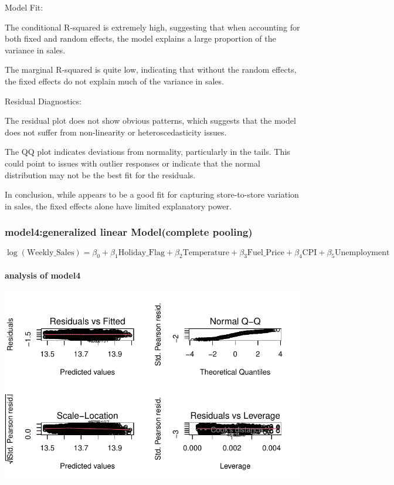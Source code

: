 \documentclass[
  letterpaper,
  DIV=11,
  numbers=noendperiod]{scrartcl}
\let\oldparagraph\paragraph
\renewcommand{\paragraph}[1]{\oldparagraph{#1}\mbox{}}
\begin{document}
Model Fit:

The conditional R-squared is extremely high, suggesting that when
accounting for both fixed and random effects, the model explains a large
proportion of the variance in sales.

The marginal R-squared is quite low, indicating that without the random
effects, the fixed effects do not explain much of the variance in sales.

Residual Diagnostics:

The residual plot does not show obvious patterns, which suggests that
the model does not suffer from non-linearity or heteroscedasticity
issues.

The QQ plot indicates deviations from normality, particularly in the
tails. This could point to issues with outlier responses or indicate
that the normal distribution may not be the best fit for the residuals.

In conclusion, while appears to be a good fit for capturing
store-to-store variation in sales, the fixed effects alone have limited
explanatory power.

\hypertarget{model4generalized-linear-modelcomplete-pooling}{%
\subsubsection{model4:generalized linear Model(complete
pooling)}\label{model4generalized-linear-modelcomplete-pooling}}

\[\log(\text{Weekly_Sales}) = \beta_0 + \beta_1 \text{Holiday_Flag} + \beta_2 \text{Temperature} + \beta_3 \text{Fuel_Price} + \beta_4 \text{CPI} + \beta_5 \text{Unemployment}\]

\hypertarget{analysis-of-model4}{%
\paragraph{analysis of model4}\label{analysis-of-model4}}

\includegraphics{678final_files/figure-pdf/unnamed-chunk-11-1.pdf}
\end{document}
